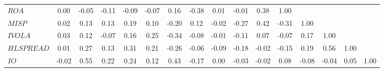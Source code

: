 \begin{tabular}{lccccccccccccccc}
$ROA$   & 0.00    & -0.05   & -0.11   & -0.09   & -0.07   & 0.16    & -0.38   & 0.01    & -0.01   & 0.38    & 1.00    &         &         &         &  \\
$MISP$  & 0.02    & 0.13    & 0.13    & 0.19    & 0.10    & -0.20   & 0.12    & -0.02   & -0.27   & 0.42    & -0.31   & 1.00    &         &         &  \\
$IVOLA$ & 0.03    & 0.12    & -0.07   & 0.16    & 0.25    & -0.34   & -0.08   & -0.01   & -0.11   & 0.07    & -0.07   & 0.17    & 1.00    &         &  \\
$HLSPREAD$ & 0.01    & 0.27    & 0.13    & 0.31    & 0.21    & -0.26   & -0.06   & -0.09   & -0.18   & -0.02   & -0.15   & 0.19    & 0.56    & 1.00    &  \\
$IO$    & -0.02   & 0.55    & 0.22    & 0.24    & 0.12    & 0.43    & -0.17   & 0.00    & -0.03   & -0.02   & 0.08    & -0.08   & -0.04   & 0.05    & 1.00 \bigstrut[b]\\
\hline
\hline
\end{tabular}%
